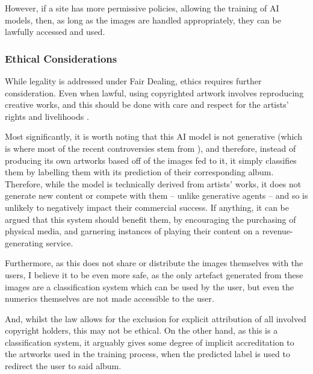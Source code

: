                   However, if a site has more permissive policies, allowing the training of AI models, then, as long as the images are handled appropriately, they can be lawfully accessed and used.
    
              \subsubsection{Ethical Considerations}
    
                  While legality is addressed under Fair Dealing, ethics requires further consideration. Even when lawful, using copyrighted artwork involves reproducing creative works, and this should be done with care and respect for the artists’ rights and livelihoods \cite{heikkila2022ai_art}.
    
                  Most significantly, it is worth noting that this AI model is not generative (which is where most of the recent controversies stem from \cite{apnews2025mccartney_ai_warning}), and therefore, instead of producing its own artworks based off of the images fed to it, it simply classifies them by labelling them with its prediction of their corresponding album. Therefore, while the model is technically derived from artists' works, it does not generate new content or compete with them -- unlike generative agents \cite{times2025photographer_ai_copy} -- and so is unlikely to negatively impact their commercial success. If anything, it can be argued that this system should benefit them, by encouraging the purchasing of physical media, and garnering instances of playing their content on a revenue-generating service.
    
                  Furthermore, as this does not share or distribute the images themselves with the users, I believe it to be even more safe, as the only artefact generated from these images are a classification system which can be used by the user, but even the numerics themselves are not made accessible to the user.
    
                  And, whilst the law allows for the exclusion for explicit attribution of all involved copyright holders, this may not be ethical. On the other hand, as this is a classification system, it arguably gives some degree of implicit accreditation to the artworks used in the training process, when the predicted label is used to redirect the user to said album.
    
